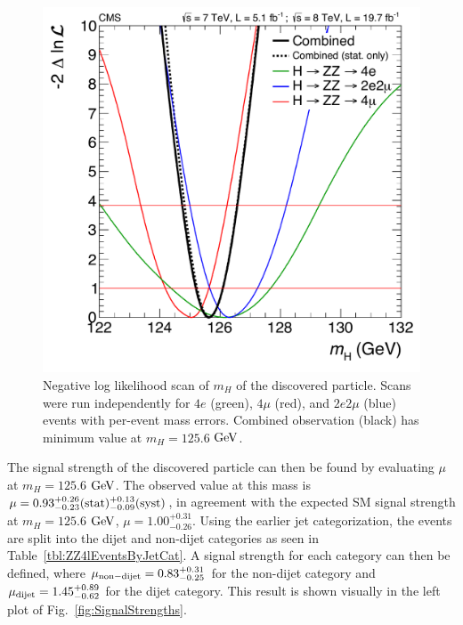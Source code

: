 \begin{figure}[htbp]
\begin{center}
\includegraphics[width=.45\linewidth]{HiggsDiscovery/figures/obs_1d_likelihood_mass_3Dbase_sys.pdf}
\caption[Mass Measurement of the Discovered Particle]{Negative log likelihood scan of $m_H$ of the discovered particle. Scans were run independently for $4e$ (green), $4\mu$ (red), and $2e2\mu$ (blue) events with per-event mass errors. Combined observation (black) has minimum value at $m_H=125.6$ $\rm{GeV}$.}
\label{fig:MassLikelihood}
\end{center}
\end{figure}

The signal strength of the discovered particle can then be found by evaluating $\mu$ at $m_H=125.6$ $\rm{GeV}$. The observed value at this mass is $\mu = 0.93^{+0.26}_{-0.23}(\rm{stat}) ^{+0.13}_{-0.09}(\rm{syst})$, in agreement with the expected SM signal strength at $m_H=125.6$ $\rm{GeV}$, $\mu = 1.00^{+0.31}_{-0.26}$. Using the earlier jet categorization, the events are split into the dijet and non-dijet categories as seen in Table~\ref{tbl:ZZ4lEventsByJetCat}. A signal strength for each category can then be defined, where $\mu_{\rm{non-dijet}}=0.83^{+0.31}_{-0.25}$ for the non-dijet category and $\mu_{\rm{dijet}} = 1.45^{+0.89}_{-0.62}$ for the dijet category. This result is shown visually in the left plot of Fig.~\ref{fig:SignalStrengths}.


